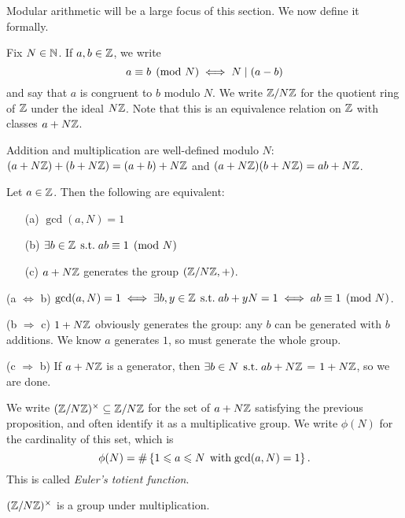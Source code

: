 \documentclass{article}
\begin{document}
Modular arithmetic will be a large focus of this section. We now define it formally.

\begin{definition}[Congruence]
	Fix $N \in \mathbb{N}$. If $a, b \in \mathbb{Z}$, we write
	\[
	a \equiv b \pmod{N} \iff N \mid (a-b)
	\]
	and say that $a$ is congruent to $b$ modulo $N$. We write $\mathbb{Z} / N \mathbb{Z}$ for the quotient ring of $\mathbb{Z}$ under the ideal $N \mathbb{Z}$. Note that this is an equivalence relation on $\mathbb{Z}$ with classes $a + N \mathbb{Z}$.
\end{definition}

\begin{note}
	Addition and multiplication are well-defined modulo $N$: $(a + N\mathbb{Z}) + (b + N\mathbb{Z}) = (a+b) + N\mathbb{Z}$ and $(a + N\mathbb{Z})(b + N\mathbb{Z}) = ab + N\mathbb{Z}$.
\end{note}

\begin{proposition}
	Let $a \in \mathbb{Z}$. Then the following are equivalent:
	\begin{enumerate}
		\item[(a)] $\gcd (a, N) = 1$
		\item[(b)] $\exists b \in \mathbb{Z} \mathrel{\, \text{s.t.}} ab \equiv 1 \pmod{N}$
		\item[(c)] $a + N \mathbb{Z}$ generates the group $(\mathbb{Z}/N\mathbb{Z}, +)$.
	\end{enumerate}
\end{proposition}

\begin{prf}
	(a $\Leftrightarrow$ b) $\gcd (a, N) = 1 \iff \exists b, y \in \mathbb{Z} \mathrel{\, \text{s.t.}} ab + yN = 1 \iff ab \equiv 1 \pmod{N}$.
	
	(b $\Rightarrow$ c) $1 + N \mathbb{Z}$ obviously generates the group: any $b$ can be generated with $b$ additions. We know $a$ generates $1$, so must generate the whole group.
	
	(c $\Rightarrow$ b) If $a + N\mathbb{Z}$ is a generator, then $\exists b \in N \mathrel{\, \text{s.t.}} ab + N\mathbb{Z}$ = $1 + N\mathbb{Z}$, so we are done.
\end{prf}

We write $(\mathbb{Z}/N\mathbb{Z})^\times \subseteq \mathbb{Z}/N\mathbb{Z}$ for the set of $a + N\mathbb{Z}$ satisfying the previous proposition, and often identify it as a multiplicative group. We write $\phi(N)$ for the cardinality of this set, which is
\[
\phi(N) = \#\left\lbrace 1 \leqslant a \leqslant N \mathrel{\, \text{with}} \gcd (a, N) = 1 \right\rbrace.
\]
This is called \textit{Euler's totient function}.

\begin{corollary}
	$(\mathbb{Z}/N\mathbb{Z})^\times$ is a group under multiplication.
\end{corollary}
\end{document}
